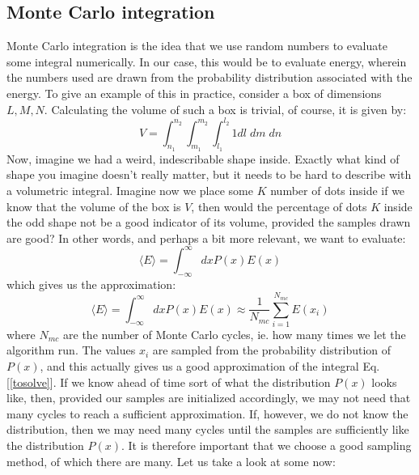 \documentclass[12pt]{article}
\begin{document}
{\subsection{Monte Carlo integration}
Monte Carlo integration is the idea that we use random numbers to evaluate some integral numerically. In our case, this would be to evaluate energy, wherein the numbers used are drawn from the probability distribution associated with the energy. \newline
To give an example of this in practice, consider a box of dimensions $L, M, N$. Calculating the volume of such a box is trivial, of course, it is given by:
\begin{equation*}
    V = \int_{n_1}^{n_2}\int_{m_1}^{m_2}\int_{l_1}^{l_2} 1 dl \; dm \; dn 
\end{equation*}
Now, imagine we had a weird, indescribable shape inside. Exactly what kind of shape you imagine doesn't really matter, but it needs to be hard to describe with a volumetric integral. Imagine now we place some $K$ number of dots inside if we know that the volume of the box is $V$, then would the percentage of dots $K$ inside the odd shape not be a good indicator of its volume, provided the samples drawn are good? \newline
In other words, and perhaps a bit more relevant, we want to evaluate:
\begin{equation*}
    \langle E \rangle = \int_{-\infty}^\infty dx P(x) E(x)
\end{equation*}
which gives us the approximation:
\begin{equation*}
    \langle E \rangle = \int_{-\infty}^\infty dx P(x) E(x) \approx \frac{1}{N_{mc}} \sum_{i=1}^{N_{mc}} E(x_i)
\end{equation*}
where $N_{mc}$ are the number of Monte Carlo cycles, ie. how many times we let the algorithm run. The values $x_i$ are sampled from the probability distribution of $P(x)$, and this actually gives us a good approximation of the integral Eq. [\ref{tosolve}]. \newline
If we know ahead of time sort of what the distribution $P(x)$ looks like, then, provided our samples are initialized accordingly, we may not need that many cycles to reach a sufficient approximation. If, however, we do not know the distribution, then we may need many cycles until the samples are sufficiently like the distribution $P(x)$. It is therefore important that we choose a good sampling method, of which there are many. Let us take a look at some now:
}
\end{document}
